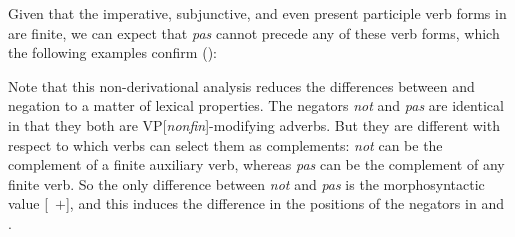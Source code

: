 \documentclass[output=paper
 	        ,biblatex
                ,babelshorthands
                ,newtxmath
                ,draftmode
                ,colorlinks, citecolor=brown
]{langscibook}
\begin{document}
\begin{exe}
\begin{xlist}
\begin{exe}
\begin{xlist}
Given that the imperative, subjunctive,
and even present participle verb forms in  are finite, we
can expect that \textit{pas} cannot precede any of these verb
forms, which the following examples confirm (\citealp[]{Kim:00}):

\eal
{}
\zl

\eal
{}
\zl

\eal
{}
\zl

\eal
{}
\zl

Note that this non-derivational analysis reduces the differences between
 and  negation to a matter of lexical properties.
The negators \textit{not} and \textit{pas} are identical in that they both are
VP[\textit{nonfin}]-modifying adverbs. But they are different with respect to
which verbs can select them as complements:  \textit{not} can be the
complement of a finite auxiliary verb, whereas \textit{pas} can be the
complement of any finite verb.  So the only difference between \emph{not}
and \emph{pas} is the morphosyntactic value [\AUX\ $+$], and this induces
the difference in the positions of the negators in  and .




\end{xlist}
\end{exe}
\end{xlist}
\end{exe}
\end{document}
